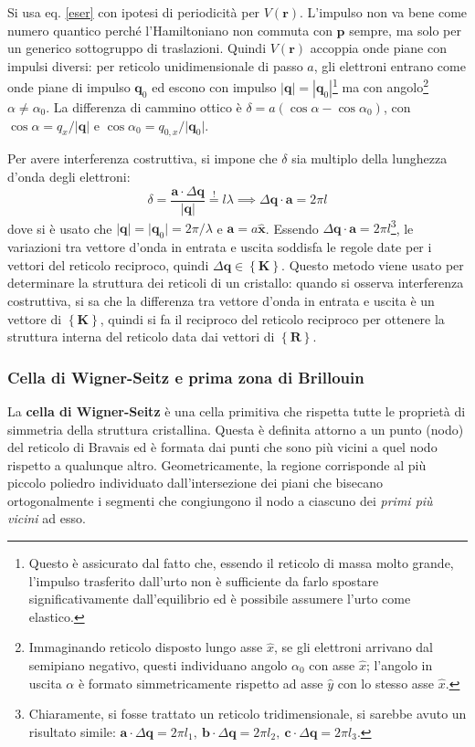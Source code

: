 \documentclass[10pt, a4paper]{scrartcl}
\numberwithin{equation}{subsection}
\theoremstyle{style1}
\begin{document}
Si usa eq. \ref{eser} con ipotesi di periodicit\`a per $V(\mathbf{r} )$. 
L'impulso non va bene come numero quantico perch\'e l'Hamiltoniano non commuta con $\mathbf{p} $ sempre, ma solo per un generico sottogruppo di traslazioni. 
Quindi $V(\mathbf{r} )$ accoppia onde piane con impulsi diversi: per reticolo unidimensionale di passo $a$, gli elettroni entrano come onde piane di impulso $\mathbf{q} _0$ ed escono con impulso $|\mathbf{q} | = | \mathbf{q} _0|$\footnote{Questo \`e assicurato dal fatto che, essendo il reticolo di massa molto grande, l'impulso trasferito dall'urto non \`e sufficiente da farlo spostare significativamente dall'equilibrio ed \`e possibile assumere l'urto come elastico.} ma con angolo\footnote{Immaginando reticolo disposto lungo asse $\hat{x}$, se gli elettroni arrivano dal semipiano negativo, questi individuano angolo $\alpha_0$ con asse $\hat{x}$; l'angolo in uscita $\alpha $ \`e formato simmetricamente rispetto ad asse $\hat{y}$ con lo stesso asse $\hat{x}$.} $\alpha \neq \alpha _0$. 
La differenza di cammino ottico \`e $\delta = a(\cos \alpha - \cos \alpha _0)$, con $\cos \alpha  = q_x / \lvert \mathbf{q}  \rvert $ e $\cos \alpha _0 = q_{0,x} / \lvert \mathbf{q} _0 \rvert $.

Per avere interferenza costruttiva, si impone che $\delta $ sia multiplo della lunghezza d'onda degli elettroni:
\[
	\delta = \frac{\mathbf{a} \cdot  \Delta \mathbf{q} }{\lvert \mathbf{q}  \rvert } \stackrel{!}{=} l \lambda  \implies \Delta \mathbf{q} \cdot \mathbf{a}  = 2\pi l  
\] 
dove si \`e usato che $\lvert \mathbf{q}  \rvert = \lvert \mathbf{q} _0 \rvert = 2\pi /\lambda $ e $\mathbf{a } = a \hat{\mathbf{x} }$.
Essendo $\Delta \mathbf{q} \cdot \mathbf{a}  = 2\pi l$\footnote{Chiaramente, si fosse trattato un reticolo tridimensionale, si sarebbe avuto un risultato simile: $\mathbf{a } \cdot  \Delta \mathbf{q} = 2\pi l_1, \ \mathbf{b} \cdot  \Delta \mathbf{q} = 2\pi l_2, \ \mathbf{c} \cdot \Delta \mathbf{q} = 2\pi l_3$.}, le variazioni tra vettore d'onda in entrata e uscita soddisfa le regole date per i vettori del reticolo reciproco, quindi $\Delta \mathbf{q} \in \left\{ \mathbf{K}  \right\} $.
Questo metodo viene usato per determinare la struttura dei reticoli di un cristallo: quando si osserva interferenza costruttiva, si sa che la differenza tra vettore d'onda in entrata e uscita \`e un vettore di $\left\{ \mathbf{K}  \right\} $, quindi si fa il reciproco del reticolo reciproco per ottenere la struttura interna del reticolo data dai vettori di $\left\{ \mathbf{R}  \right\} $.
\subsubsection{Cella di Wigner-Seitz e prima zona di Brillouin}
La \textbf{cella di Wigner-Seitz} \`e una cella primitiva che rispetta tutte le propriet\`a di simmetria della struttura cristallina. Questa \`e definita attorno a un punto (nodo) del reticolo di Bravais ed \`e formata dai punti che sono pi\`u vicini a quel nodo rispetto a qualunque altro. Geometricamente, la regione corrisponde al pi\`u piccolo poliedro individuato dall'intersezione dei piani che bisecano ortogonalmente i segmenti che congiungono il nodo a ciascuno dei \textit{primi pi\`u vicini} ad esso.
\end{document}
